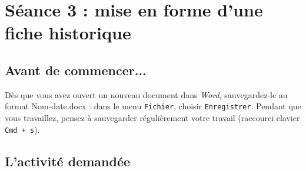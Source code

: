 \newpage

\section{Séance 3 : mise en forme d'une fiche historique}\label{ficheTexte5e3}

\subsection{Avant de commencer...}

Dès que vous avez ouvert un nouveau document dans \emph{Word}, sauvegardez-le au format Nom-date.docx : dans le menu \texttt{Fichier}, choisir \texttt{Enregistrer}. Pendant que vous travaillez, pensez à sauvegarder régulièrement votre travail (raccourci clavier \texttt{Cmd + s}).   


\subsection{L'activité demandée}


